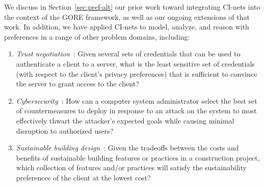 We discuss in Section~\ref{sec:pref-alt} our prior work toward integrating CI-nets into the context of the GORE framework, as well as our ongoing extensions of that work. In addition, we have applied CI-nets to model, analyze, and reason with preferences in a range of other problem domains, including:
\begin{enumerate}
	\item \emph{Trust negotiation}~\cite{Oster:FACS12}: Given several sets of credentials that can be used to authenticate a client to a server, what is the least sensitive set of credentials (with respect to the client's privacy preferences) that is sufficient to convince the server to grant access to the client? 
	\item \emph{Cybersecurity}~\cite{Santhanam:CSIIRW2013}: How can a computer system administrator select the best set of countermeasures to deploy in response to an attack on the system to most effectively thwart the attacker's expected goals while causing minimal disruption to authorized users?
	\item \emph{Sustainable building design}~\cite{Santhanam:AAAISpring11}: Given the tradeoffs between the costs and benefits of sustainable building features or practices in a construction project, which collection of features and/or practices will satisfy the sustainability preferences of the client at the lowest cost?
\end{enumerate}
